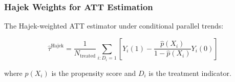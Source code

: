 \documentclass[11pt]{beamer}
\begin{document}
\begin{frame}
\frametitle{Hajek Weights for ATT Estimation}

The Hajek-weighted ATT estimator under conditional parallel trends:

\[ \hat{\tau}^{\text{Hajek}} = \frac{1}{N_{\text{treated}}}
   \sum_{i: D_i = 1}
   \left[ Y_i(1) - \frac{\hat{p}(X_i)}{1-\hat{p}(X_i)} Y_i(0) \right] \]

where $\hat{p}(X_i)$ is the propensity score and $D_i$ is the treatment indicator.

\end{frame}
\end{document}
